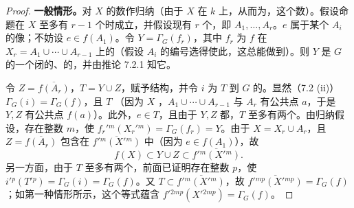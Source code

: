 \begin{proof}
\textbf{一般情形。}对 $X$ 的数作归纳（由于 $X$ 在 $k$ 上，从而为，这个数）。假设命题在 $X$ 至多有 $r-1$ 个时成立，并假设现有 $r$ 个，即 $A_1,\ldots,A_r$。$e$ 属于某个 $A_i$ 的像；不妨设 $e\in f(A_1)$。令 $Y=\Gamma_G(f_r)$，其中 $f_r$ 为 $f$ 在 $X_r=A_1\cup\cdots\cup A_{r-1}$ 上的（假设 $A_i$ 的编号选得使此，这总能做到）。则 $Y$ 是 $G$ 的一个闭的、的，并由推论 7.2.1 知它。

令 $Z=\overline{f(A_r)}$，$T=Y\cup Z$，赋予结构，并令 $i$ 为 $T$ 到 $G$ 的。显然（7.2 (ii)）$\Gamma_G(i)=\Gamma_G(f)$，且 $T$ （因为 $X$ ，$A_1\cup\cdots\cup A_{r-1}$ 与 $A_r$ 有公共点 $a$，于是 $Y,Z$ 有公共点 $f(a)$）。此外，$e\in T$，且由于 $Y,Z$ 都，$T$ 至多有两个。由归纳假设，存在整数 $m$，使 $f_r'{}^m(X_r'{}^m)=\Gamma_G(f_r)=Y$。由于 $X=X_r\cup A_r$，且 $Z=\overline{f(A_r)}$ 包含在 $\overline{f'{}^m(X'{}^m)}$ 中（因为 $e\in f(A_1)$），故
\[
f(X)\subset Y\cup Z\subset\overline{f'{}^m(X'{}^m)}.
\]
另一方面，由于 $T$ 至多有两个，前面已证明存在整数 $p$，使 $i'{}^p(T'{}^p)=\Gamma_G(i)=\Gamma_G(f)$。又 $T\subset\overline{f'{}^m(X'{}^m)}$，故 $\overline{f'{}^{mp}(X'{}^{mp})}=\Gamma_G(f)$；如第一种情形所示，这个等式蕴含 $f'{}^{2mp}(X'{}^{2mp})=\Gamma_G(f)$。
\end{proof}

